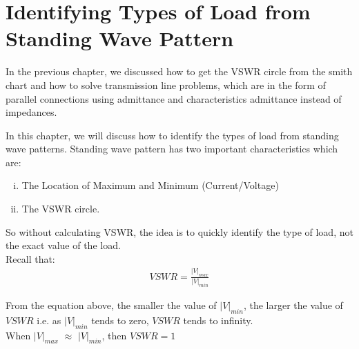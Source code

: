 \chapter{Identifying Types of Load from Standing Wave Pattern}\label{lec:lec9}

In the previous chapter, we discussed how to get the VSWR circle from the smith chart and how to solve transmission line problems, which are in the form of parallel connections using admittance and characteristics admittance instead of impedances.

In this chapter, we will discuss how to identify the types of load from standing wave patterns. Standing wave pattern has two important characteristics which are:
\begin{enumerate}[(i)]
\item The Location of Maximum and Minimum (Current/Voltage)
\item The VSWR circle.
\end{enumerate}
So without calculating VSWR, the idea is to quickly identify the type of load, not the exact value of the load.\\
Recall that:
\begin{align}
VSWR = \frac{|V|_{max}}{|V|_{min}}
\end{align}

From the equation above, the smaller the value of $|V|_{min}$, the larger the value of ${VSWR}$ i.e. as $|V|_{min}$ tends to zero, ${VSWR}$ tends to infinity.\\
When $|V|_{max}$ ${\approx}$ $|V|_{min}$, then $VSWR = 1$\\

